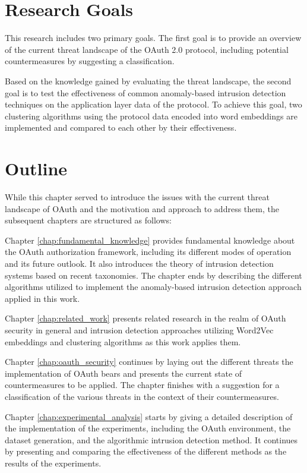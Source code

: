 \documentclass[
    fontsize=12pt,
    headings=small,
    parskip=half,           %
    bibliography=totoc,
    numbers=noenddot,       %
    open=any,               %
    ]{scrreprt}
\begin{document}
\section{Research Goals}
This research includes two primary goals. The first goal is to provide an overview of the current threat landscape of the OAuth 2.0 protocol, including potential countermeasures by suggesting a classification. 

Based on the knowledge gained by evaluating the threat landscape, the second goal is to test the effectiveness of common anomaly-based intrusion detection techniques on the application layer data of the protocol. To achieve this goal, two clustering algorithms using the protocol data encoded into word embeddings are implemented and compared to each other by their effectiveness.


\section{Outline}
While this chapter served to introduce the issues with the current threat landscape of OAuth and the motivation and approach to address them, the subsequent chapters are structured as follows:

Chapter \ref{chap:fundamental_knowledge} provides fundamental knowledge about the OAuth authorization framework, including its different modes of operation and its future outlook. It also introduces the theory of intrusion detection systems based on recent taxonomies. The chapter ends by describing the different algorithms utilized to implement the anomaly-based intrusion detection approach applied in this work. 

Chapter \ref{chap:related_work} presents related research in the realm of OAuth security in general and intrusion detection approaches utilizing Word2Vec embeddings and clustering algorithms as this work applies them.

Chapter \ref{chap:oauth_security} continues by laying out the different threats the implementation of OAuth bears and presents the current state of countermeasures to be applied. The chapter finishes with a suggestion for a classification of the various threats in the context of their countermeasures.

Chapter \ref{chap:experimental_analysis} starts by giving a detailed description of the implementation of the experiments, including the OAuth environment, the dataset generation, and the algorithmic intrusion detection method. It continues by presenting and comparing the effectiveness of the different methods as the results of the experiments.
\end{document}

